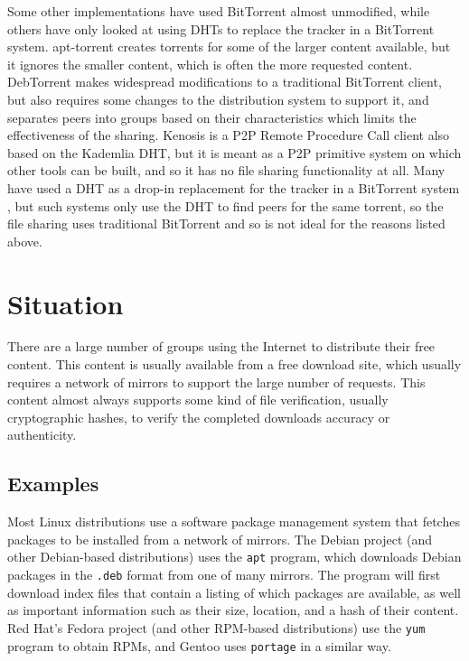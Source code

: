 \documentclass[conference]{IEEEtran}
\begin{document}
Some other implementations have used BitTorrent almost unmodified,
while others have only looked at using DHTs to replace the tracker
in a BitTorrent system. apt-torrent \cite{apttorrent} creates
torrents for some of the larger content available, but it ignores
the smaller content, which is often the more requested content.
DebTorrent \cite{debtorrent} makes widespread modifications to a
traditional BitTorrent client, but also requires some changes to the
distribution system to support it, and separates peers into groups
based on their characteristics which limits the effectiveness of the
sharing. Kenosis \cite{kenosis} is a P2P Remote Procedure Call
client also based on the Kademlia DHT, but it is meant as a P2P
primitive system on which other tools can be built, and so it has no
file sharing functionality at all. Many have used a DHT as a drop-in
replacement for the tracker in a BitTorrent system
\cite{bittorrent-dht, azureus-dht}, but such systems only use the
DHT to find peers for the same torrent, so the file sharing uses
traditional BitTorrent and so is not ideal for the reasons listed
above.


\section{Situation}
\label{situation}

There are a large number of groups using the Internet to distribute
their free content. This content is usually available from a free
download site, which usually requires a network of mirrors to
support the large number of requests. This content almost always
supports some kind of file verification, usually cryptographic
hashes, to verify the completed downloads accuracy or authenticity.

\subsection{Examples}
\label{examples}

Most Linux distributions use a software package management system
that fetches packages to be installed from a network of mirrors. The
Debian project \cite{debian} (and other Debian-based distributions)
uses the \texttt{apt} program, which downloads Debian packages in
the \texttt{.deb} format from one of many mirrors. The program will
first download index files that contain a listing of which packages
are available, as well as important information such as their size,
location, and a hash of their content. Red Hat's Fedora project
\cite{fedora} (and other RPM-based distributions) use the
\texttt{yum} program to obtain RPMs, and Gentoo \cite{gentoo} uses
\texttt{portage} in a similar way.
\end{document}
